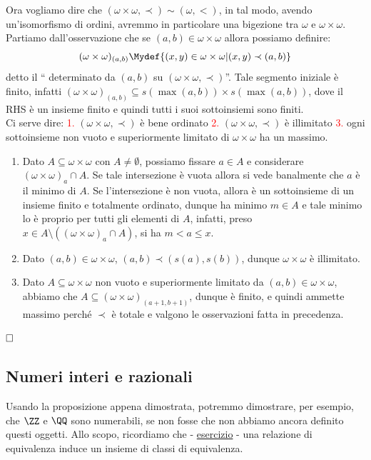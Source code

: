 	Ora vogliamo dire che $(\omega \times \omega, \prec) \sim (\omega, <)$, in tal modo, avendo un'isomorfismo di ordini, avremmo in particolare una bigezione tra $\omega$ e $\omega \times \omega$.
	Partiamo dall'osservazione che se $(a,b) \in \omega \times \omega$ allora possiamo definire:
	\[ (\omega \times \omega)_{(a,b)} \Mydef \{(x,y) \in \omega \times \omega | (x,y) \prec (a,b)\}
		\]
	detto il `` determinato da $(a,b)$ su $(\omega \times \omega,\prec)$''. Tale segmento iniziale è finito, infatti $(\omega \times \omega)_{(a,b)} \subseteq s(\max(a,b)) \times s(\max(a,b))$, dove il RHS è un insieme finito e quindi tutti i suoi sottoinsiemi sono finiti.\\
	Ci serve dire: \textcolor{red}{1.} $(\omega \times \omega, \prec)$ è bene ordinato \textcolor{red}{2.} $(\omega \times \omega, \prec)$ è illimitato \textcolor{red}{3.} ogni sottoinsieme non vuoto e superiormente limitato di $\omega \times \omega$ ha un massimo.
	\begin{enumerate}[1.]
		\item Dato $A \subseteq \omega \times \omega$ con $A \ne \emptyset$, possiamo fissare $a \in A$ e considerare $(\omega \times \omega)_a \cap A$. Se tale intersezione è vuota allora si vede banalmente che $a$ è il minimo di $A$. Se l'intersezione è non vuota, allora è un sottoinsieme di un insieme finito e totalmente ordinato, dunque ha minimo $m \in A$ e tale minimo 
		lo è proprio per tutti gli elementi di $A$, infatti, preso $x \in A \setminus((\omega \times \omega)_a \cap A)$, si ha $m < a \leq x$.
		\item Dato $(a,b) \in \omega \times \omega$, $(a,b) \prec (s(a),s(b))$, dunque $\omega \times \omega$ è illimitato.
		\item Dato $A \subseteq \omega \times \omega$ non vuoto e superiormente limitato da $(a,b) \in \omega \times \omega$, abbiamo che $A \subseteq (\omega \times \omega)_{(a+1,b+1)}$, dunque è finito, e quindi ammette massimo perché $\prec$ è totale e valgono le osservazioni fatta in precedenza.
	\end{enumerate}
$\hfill\square$

\subsection{Numeri interi e razionali}
Usando la proposizione appena dimostrata, potremmo dimostrare, per esempio, che $\ZZ$ e $\QQ$ sono numerabili, se non fosse che non abbiamo ancora definito questi oggetti. Allo scopo, ricordiamo che - \hyperref[3.73]{esercizio} - una relazione di equivalenza
induce un insieme di classi di equivalenza.

